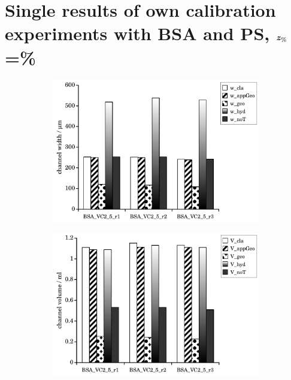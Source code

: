 \section*{Single results of own calibration experiments with BSA and PS, 
  $\bm{z_\text{\%}}$\thinspace=\thinspace\%}
\renewcommand{\subFigSize}{0.49\linewidth}
\begin{figure}[htp]
  \begin{center}
    \begin{subfigure}{\subFigSize}
      \includegraphics[width=\linewidth]{./images/data/eval_own_p8/calibW_BSA_VC_2_5_p8.pdf}
    \end{subfigure}
    \begin{subfigure}{\subFigSize}
      \includegraphics[width=\linewidth]{./images/data/eval_own_p8/calibV_BSA_VC_2_5_p8.pdf}

\end{subfigure}
\end{center}
\end{figure}

